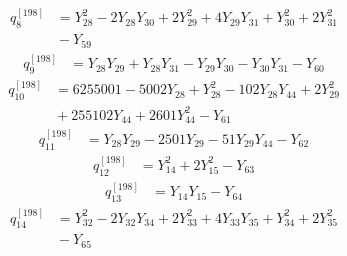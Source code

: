 \begin{equation}\label{q198:row:008}
\begin{aligned}
q_{8}^{[198]} &={} Y_{28}^{2} - 2Y_{28}Y_{30} + 2Y_{29}^{2} + 4Y_{29}Y_{31} + Y_{30}^{2} + 2Y_{31}^{2}\\
&{} - Y_{59}
\end{aligned}
\end{equation}
\begin{equation}\label{q198:row:009}
\begin{aligned}
q_{9}^{[198]} &={} Y_{28}Y_{29} + Y_{28}Y_{31} - Y_{29}Y_{30} - Y_{30}Y_{31} - Y_{60}
\end{aligned}
\end{equation}
\begin{equation}\label{q198:row:010}
\begin{aligned}
q_{10}^{[198]} &={} 6255001 - 5002Y_{28} + Y_{28}^{2} - 102Y_{28}Y_{44} + 2Y_{29}^{2}\\
&{} + 255102Y_{44} + 2601Y_{44}^{2} - Y_{61}
\end{aligned}
\end{equation}
\begin{equation}\label{q198:row:011}
\begin{aligned}
q_{11}^{[198]} &={} Y_{28}Y_{29} - 2501Y_{29} - 51Y_{29}Y_{44} - Y_{62}
\end{aligned}
\end{equation}
\begin{equation}\label{q198:row:012}
\begin{aligned}
q_{12}^{[198]} &={} Y_{14}^{2} + 2Y_{15}^{2} - Y_{63}
\end{aligned}
\end{equation}
\begin{equation}\label{q198:row:013}
\begin{aligned}
q_{13}^{[198]} &={} Y_{14}Y_{15} - Y_{64}
\end{aligned}
\end{equation}
\begin{equation}\label{q198:row:014}
\begin{aligned}
q_{14}^{[198]} &={} Y_{32}^{2} - 2Y_{32}Y_{34} + 2Y_{33}^{2} + 4Y_{33}Y_{35} + Y_{34}^{2} + 2Y_{35}^{2}\\
&{} - Y_{65}
\end{aligned}
\end{equation}
